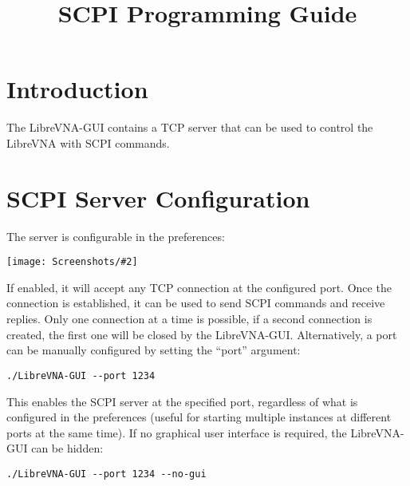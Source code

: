 \documentclass[a4paper,11pt]{article}
\title{\vna{} SCPI Programming Guide}
\newcommand{\vna}{LibreVNA}
\newcommand{\gui}{\vna{}-GUI}
\newcommand{\screenshot}[2]{\begin{center}
\texttt{[image: Screenshots/\#2]}
\end{center}}
\begin{document}
\maketitle

\setcounter{tocdepth}{3}
\tableofcontents

\clearpage

\section{Introduction}
The \gui{} contains a TCP server that can be used to control the \vna{} with SCPI commands.
\section{SCPI Server Configuration}
The server is configurable in the preferences: 
\screenshot{0.3}{serverconfig.png}
If enabled, it will accept any TCP connection at the configured port. Once the connection is established, it can be used to send SCPI commands and receive replies. Only one connection at a time is possible, if a second connection is created, the first one will be closed by the \gui{}. Alternatively, a port can be manually configured by setting the ``port'' argument:
\begin{lstlisting}
./LibreVNA-GUI --port 1234
\end{lstlisting}
This enables the SCPI server at the specified port, regardless of what is configured in the preferences (useful for starting multiple instances at different ports at the same time). If no graphical user interface is required, the \gui{} can be hidden:
\begin{lstlisting}
./LibreVNA-GUI --port 1234 --no-gui
\end{lstlisting}
\end{document}
